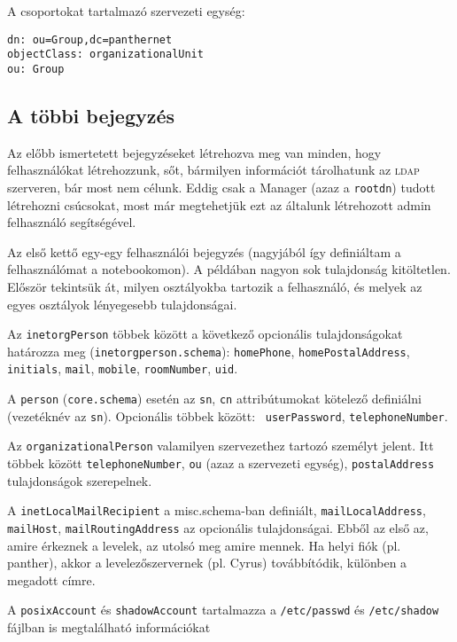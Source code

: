 \noindent A csoportokat tartalmazó szervezeti egység:

\begin{Verbatim}[frame=single]
dn: ou=Group,dc=panthernet
objectClass: organizationalUnit
ou: Group
\end{Verbatim}



\subsection{A többi bejegyzés}
Az előbb ismertetett bejegyzéseket létrehozva meg van minden, hogy felhasználókat létrehozzunk, sőt, bármilyen
információt tárolhatunk az \textsc{ldap} szerveren, bár most nem célunk. Eddig csak a Manager (azaz a \texttt{rootdn}) tudott
létrehozni csúcsokat, most már megtehetjük ezt az általunk létrehozott admin felhasználó segítségével.


Az első kettő egy-egy felhasználói bejegyzés (nagyjából így definiáltam a felhasználómat a notebookomon).
A példában nagyon sok tulajdonság kitöltetlen. Először tekintsük át, milyen osztályokba tartozik a felhasználó, és
melyek az egyes osztályok lényegesebb tulajdonságai.

Az \texttt{inetorgPerson} többek között a következő opcionális tulajdonságokat határozza meg
(\texttt{inetorgperson.schema}):
\texttt{homePhone}, \texttt{homePostalAddress}, \texttt{initials}, \texttt{mail},  \texttt{mobile},
\texttt{roomNumber}, \texttt{uid}.

A \texttt{person} (\texttt{core.schema}) esetén az \texttt{sn}, \texttt{cn} attribútumokat kötelező definiálni
(vezetéknév az \texttt{sn}). Opcionális többek között: \texttt{ userPassword}, \texttt{telephoneNumber}.

Az \texttt{organizationalPerson} valamilyen szervezethez tartozó személyt jelent. Itt többek között
\texttt{telephoneNumber}, \texttt{ou} (azaz a szervezeti egység), \texttt{postalAddress} tulajdonságok szerepelnek.

A \texttt{inetLocalMailRecipient} a misc.schema-ban definiált, \texttt{mailLocalAddress}, \texttt{mailHost},
\texttt{mailRoutingAddress} az opcionális tulajdonságai. Ebből az első az, amire érkeznek a levelek, az utolsó meg
amire mennek. Ha helyi fiók (pl. panther), akkor a levelezőszervernek (pl. Cyrus) továbbítódik, különben a megadott
címre.

A \texttt{posixAccount} és \texttt{shadowAccount} tartalmazza a \texttt{/etc/passwd} és \texttt{/etc/shadow} fájlban
is megtalálható információkat


